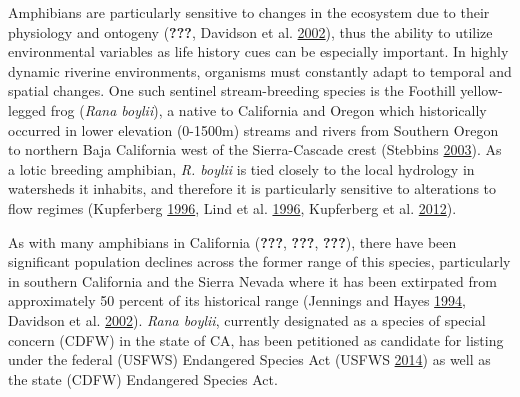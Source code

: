 \documentclass[proquest,12pt,final]{ucthesis-CA2012} %
\begin{document}
\begin{ucmainmatter}
Amphibians are particularly sensitive to changes in the ecosystem due to
their physiology and ontogeny ({\textbf{???}}, Davidson et al.
\protect\hyperlink{ref-davidson_spatial_2002}{2002}), thus the ability
to utilize environmental variables as life history cues can be
especially important. In highly dynamic riverine environments, organisms
must constantly adapt to temporal and spatial changes. One such sentinel
stream-breeding species is the Foothill yellow-legged frog (\emph{Rana
boylii}), a native to California and Oregon which historically occurred
in lower elevation (0-1500m) streams and rivers from Southern Oregon to
northern Baja California west of the Sierra-Cascade crest (Stebbins
\protect\hyperlink{ref-stebbins_field_2003}{2003}). As a lotic breeding
amphibian, \emph{R. boylii} is tied closely to the local hydrology in
watersheds it inhabits, and therefore it is particularly sensitive to
alterations to flow regimes (Kupferberg
\protect\hyperlink{ref-kupferberg_hydrologic_1996}{1996}, Lind et al.
\protect\hyperlink{ref-lind_effects_1996}{1996}, Kupferberg et al.
\protect\hyperlink{ref-kupferberg_effects_2012}{2012}).

As with many amphibians in California ({\textbf{???}}, {\textbf{???}},
{\textbf{???}}), there have been significant population declines across
the former range of this species, particularly in southern California
and the Sierra Nevada where it has been extirpated from approximately 50
percent of its historical range (Jennings and Hayes
\protect\hyperlink{ref-jennings_amphibian_1994}{1994}, Davidson et al.
\protect\hyperlink{ref-davidson_spatial_2002}{2002}). \emph{Rana
boylii}, currently designated as a species of special concern (CDFW) in
the state of CA, has been petitioned as candidate for listing under the
federal (USFWS) Endangered Species Act (USFWS
\protect\hyperlink{ref-usfws_endangered_2014}{2014}) as well as the
state (CDFW) Endangered Species Act.


\end{ucmainmatter}
\end{document}

